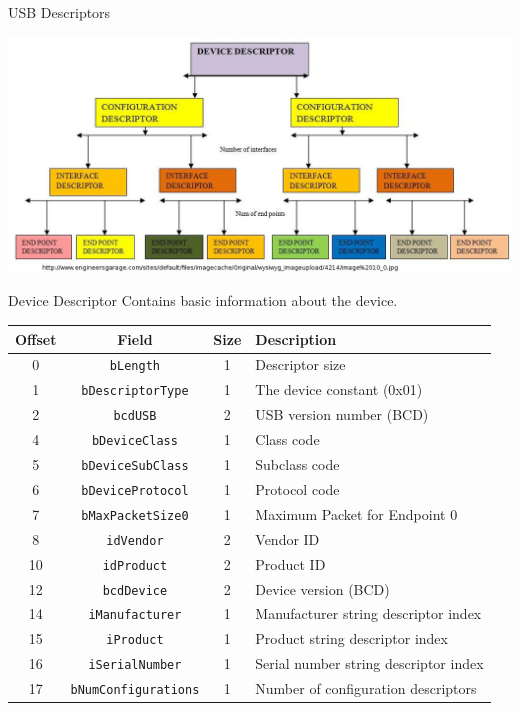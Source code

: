 \documentclass[pdf]{beamer}
\begin{document}
\begin{frame}{USB Descriptors}
  \begin{center}
    \includegraphics[scale=0.3]{img/descriptors.jpg}
  \end{center}
\end{frame}

\begin{frame}{Device Descriptor}
  Contains basic information about the device.
  \begin{table}
    \tiny
    \begin{tabular}{| c | c | c | l |}
      \hline
      \textbf{Offset} & \textbf{Field} & \textbf{Size} & \textbf{Description} \\ \hline \hline
      0 & \texttt{bLength} & 1 & Descriptor size \\ \hline
      1 & \texttt{bDescriptorType} & 1 & The device constant (0x01) \\ \hline
      2 & \texttt{bcdUSB} & 2 & USB version number (BCD) \\ \hline
      4 & \texttt{bDeviceClass} & 1 & Class code \\ \hline
      5 & \texttt{bDeviceSubClass} & 1 & Subclass code \\ \hline
      6 & \texttt{bDeviceProtocol} & 1 & Protocol code \\ \hline
      7 & \texttt{bMaxPacketSize0} & 1 & Maximum Packet for Endpoint 0 \\ \hline
      8 & \texttt{idVendor} & 2 & Vendor ID \\ \hline
      10 & \texttt{idProduct} & 2 & Product ID \\ \hline
      12 & \texttt{bcdDevice} & 2 & Device version (BCD) \\ \hline
      14 & \texttt{iManufacturer} & 1 & Manufacturer string descriptor index \\ \hline
      15 & \texttt{iProduct} & 1 & Product string descriptor index \\ \hline
      16 & \texttt{iSerialNumber} & 1 & Serial number string descriptor index \\ \hline
      17 & \texttt{bNumConfigurations} & 1 & Number of configuration descriptors \\ \hline
    \end{tabular}
  \end{table}
\end{frame}
\end{document}
